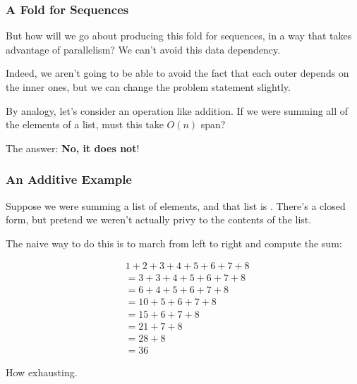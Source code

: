 \documentclass[aspectratio=169]{beamer}
\begin{document}
\begin{frame}[fragile]
  \frametitle{A Fold for Sequences}

  But how will we go about producing this fold for sequences, in a way that
  takes advantage of parallelism? We can't avoid this data dependency.

  \pause
  \vspace{\fill}

  Indeed, we aren't going to be able to avoid the fact that each outer
   depends on the inner ones, but we can change the problem statement
  slightly.

  \pause
  \vspace{\fill}

  By analogy, let's consider an operation like addition. If we were summing
  all of the elements of a list, must this take $O(n)$ span?

  \pause
  \vspace{\fill}

  The answer: \textbf{No, it does not}!
\end{frame}

\begin{frame}[fragile]
  \frametitle{An Additive Example}

  Suppose we were summing a list of elements, and that list is
  \code{[1, 2, 3, 4, 5, 6, 7, 8]}. There's a closed form, but pretend
  we weren't actually privy to the contents of the list.

  \pause
  \vspace{\fill}

  The naive way to do this is to march from left to right and compute the sum:

  \pause
  \vspace{-15pt}

  \begin{align*}
    & 1 + 2 + 3 + 4 + 5 + 6 + 7 + 8 \\
    &= 3 + 3 + 4 + 5 + 6 + 7 + 8 \\
    &= 6 + 4 + 5 + 6 + 7 + 8 \\
    &= 10 + 5 + 6 + 7 + 8 \\
    &= 15 + 6 + 7 + 8 \\
    &= 21 + 7 + 8 \\
    &= 28 + 8 \\
    &= 36
  \end{align*}

  \pause
  \vspace{\fill}

  How exhausting.
\end{frame}
\end{document}
